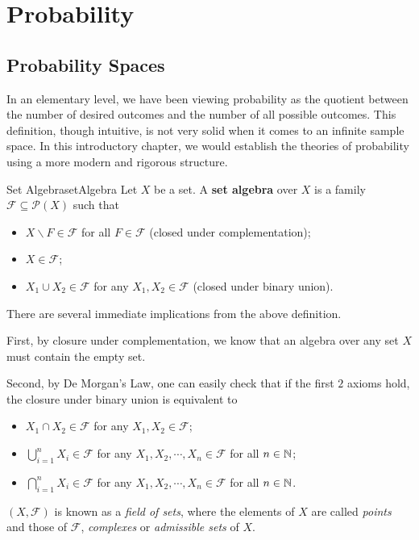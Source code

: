 \documentclass[math]{amznotes}
\theoremstyle{remark}
\begin{document}
\tableofcontents

\chapter{Probability}
\section{Probability Spaces}
In an elementary level, we have been viewing probability as the quotient between the number of desired outcomes and the number of all possible outcomes. This definition, though intuitive, is not very solid when it comes to an infinite sample space. In this introductory chapter, we would establish the theories of probability using a more modern and rigorous structure.
\begin{dfnbox}{Set Algebra}{setAlgebra}
    Let $X$ be a set. A {\color{red} \textbf{set algebra}} over $X$ is a family $\mathcal{F} \subseteq \mathcal{P}\left(X\right)$ such that 
    \begin{itemize}
        \item $X \backslash F \in \mathcal{F}$ for all $F \in \mathcal{F}$ (closed under complementation);
        \item $X \in \mathcal{F}$;
        \item $X_1 \cup X_2 \in \mathcal{F}$ for any $X_1, X_2 \in \mathcal{F}$ (closed under binary union).
    \end{itemize}
\end{dfnbox}
There are several immediate implications from the above definition. 

First, by closure under complementation, we know that an algebra over any set $X$ must contain the empty set. 

Second, by De Morgan's Law, one can easily check that if the first $2$ axioms hold, the closure under binary union is equivalent to 
\begin{itemize}
    \item $X_1 \cap X_2 \in \mathcal{F}$ for any $X_1, X_2 \in \mathcal{F}$;
    \item $\bigcup_{i = 1}^{n}X_i \in \mathcal{F}$ for any $X_1, X_2, \cdots, X_n \in \mathcal{F}$ for all $n \in \mathbb{N}$;
    \item $\bigcap_{i = 1}^{n}X_i \in \mathcal{F}$ for any $X_1, X_2, \cdots, X_n \in \mathcal{F}$ for all $n \in \mathbb{N}$.
\end{itemize}
$\left(X, \mathcal{F}\right)$ is known as a \textit{field of sets}, where the elements of $X$ are called \textit{points} and those of $\mathcal{F}$, \textit{complexes} or \textit{admissible sets} of $X$.
\end{document}
